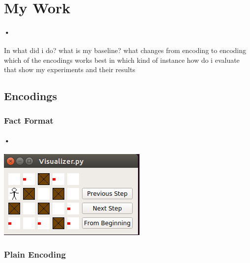 \documentclass{article}
\begin{document}
\section{My Work}
\paragraph*{•}
In 
what did i do?
what is my baseline?
what changes from encoding to encoding
which of the encodings works best in which kind of instance
how do i evaluate that
show my experiments and their results
\subsection{Encodings}
\subsubsection{Fact Format}
\paragraph*{•}
\includegraphics{Visualizer}

\subsubsection{Plain Encoding}
\end{document}

